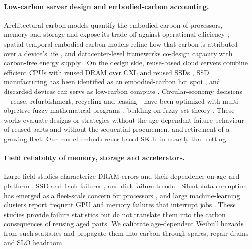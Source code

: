 \documentclass[11pt]{article}
\begin{document}
\paragraph{Low-carbon server design and embodied-carbon accounting.}
Architectural carbon models quantify the embodied carbon of processors, memory and storage and expose its trade-off against operational efficiency \citep{gupta2022act,gupta2022chasing}; spatial-temporal embodied-carbon models refine how that carbon is attributed over a device's life \citep{zhang2024spatialembodied}, and datacenter-level frameworks co-design capacity with carbon-free energy supply \citep{acun2023carbonexplorer}. On the design side, reuse-based cloud servers combine efficient CPUs with reused DRAM over CXL and reused SSDs \citep{wang2024greensku}, SSD manufacturing has been identified as an embodied-carbon hot spot \citep{tannu2023ssd}, and discarded devices can serve as low-carbon compute \citep{switzer2023junkyard}. Circular-economy decisions---reuse, refurbishment, recycling and leasing---have been optimized with multi-objective fuzzy mathematical programs \citep{poonia2024circular}, building on fuzzy-set theory \citep{zadeh1965fuzzy}. These works evaluate designs or strategies without the age-dependent failure behaviour of reused parts and without the sequential procurement and retirement of a growing fleet. Our model embeds reuse-based SKUs in exactly that setting.

\paragraph{Field reliability of memory, storage and accelerators.}
Large field studies characterize DRAM errors and their dependence on age and platform \citep{schroeder2009dram,sridharan2012dram,sridharan2015memory,meza2015dram,zivanovic2019dram,dramicdcs2024}, SSD and flash failures \citep{meza2015flash,schroeder2016flash,ssdsystor2016,ssdnas2024}, and disk failure trends \citep{pinheiro2007disk}. Silent data corruption has emerged as a fleet-scale concern for processors \citep{hochschild2021cores,dixit2021sdc,sdctaco2024}, and large machine-learning clusters report frequent GPU and memory failures that interrupt jobs \citep{llama3,kokolis2025reliability}. These studies provide failure statistics but do not translate them into the carbon consequences of reusing aged parts. We calibrate age-dependent Weibull hazards from such statistics and propagate them into carbon through spares, repair drains and SLO headroom.
\end{document}
